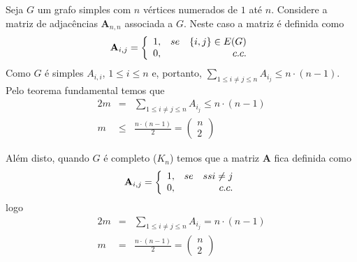 
Seja $G$ um grafo simples com $n$ vértices numerados de $1$ até $n$.
%
Considere a matriz de adjacências {\bf A}$_{n,n}$ associada a $G$.
%
Neste caso a matriz é definida como $${\bf A}_{i,j} = \left\{ \begin{array}{lr} 1, & se\quad\{i,j\} \in E(G) \\ 0, & c. c. \end{array}\right.$$
%
Como $G$ é simples $A_{i,i}$, $1 \le i \le n$ e, portanto, $\sum_{1 \le i \neq j \le n} A_{i_j} \le n\cdot (n-1)$.
%
Pelo teorema fundamental temos que 
\begin{eqnarray}
	2m &=& \sum_{1 \le i \neq j \le n} A_{i_j} \le n\cdot(n-1) \nonumber\\
	m  &\le& \frac{n\cdot(n-1)}{2} = \left(\begin{array}{c} n \\ 2 \end{array}\right) \nonumber
\end{eqnarray}
\fimprova

Além disto, quando $G$ é completo ($K_n$) temos que a matriz {\bf A} fica definida como $${\bf A}_{i,j} = \left\{ \begin{array}{lr} 1, & se\quad ssi\neq j \\ 0, & c. c. \end{array}\right.$$ logo
\begin{eqnarray}
	2m &=& \sum_{1 \le i \neq j \le n} A_{i_j} = n\cdot(n-1) \nonumber\\
	m  &=& \frac{n\cdot(n-1)}{2} = \left(\begin{array}{c} n \\ 2 \end{array}\right) \nonumber
\end{eqnarray}
\fimprova
